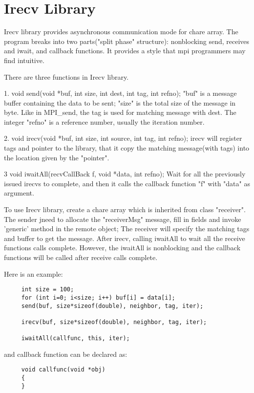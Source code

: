 \section{Irecv Library}

{\sc Irecv} library provides asynchronous communication mode for chare array. The program breaks into two parts("split phase" structure): nonblocking send, receives and iwait, and callback functions. It provides a style that mpi programmers may find intuitive. 

There are three functions in Irecv library.

1. void send(void *buf, int size, int dest, int tag, int refno);
"buf" is a message buffer containing the data to be sent; "size" is the total size of the message in byte. 
Like in MPI_send, the tag is used for matching message with dest. The integer "refno" is a reference number, usually the iteration number.
  

2. void irecv(void *buf, int size, int source, int tag, int refno);
irecv will register tags and pointer to the library, that it copy the matching message(with tags) into the location given by the "pointer".

3 void iwaitAll(recvCallBack f, void *data, int refno);
Wait for all the previously issued irecvs to complete, and then it calls the callback function "f" with "data" as argument.

To use Irecv library, create a chare array which is inherited from class "receiver". The sender jneed to allocate the "receiverMsg" message, fill in fields and invoke 'generic' method in the remote object; The receiver will specify the matching tags and buffer to get the message. After irecv, calling iwaitAll to wait all the receive functions calls complete. However, the iwaitAll is nonblocking and the callback functions will be called after receive calls complete.

Here is an example:

\begin{verbatim}
     int size = 100;
     for (int i=0; i<size; i++) buf[i] = data[i];
     send(buf, size*sizeof(double), neighbor, tag, iter);

     irecv(buf, size*sizeof(double), neighbor, tag, iter);

     iwaitAll(callfunc, this, iter);
\end{verbatim}

and callback function can be declared as:

\begin{verbatim}
     void callfunc(void *obj)
     {
     }
\end{verbatim}
